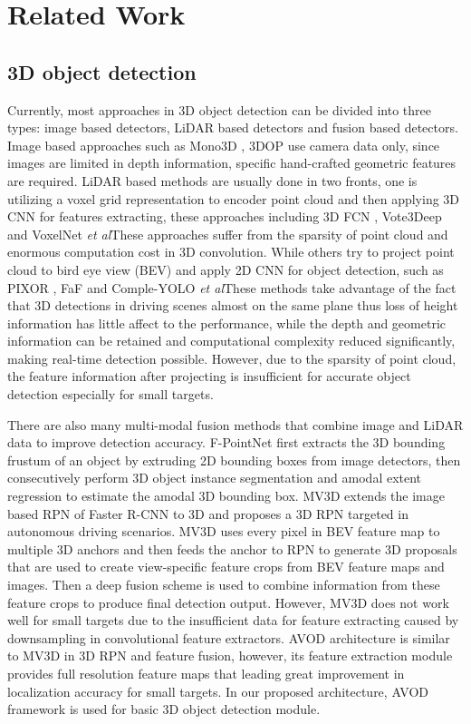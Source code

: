 \documentclass{bmvc2k}
\def\etal{\emph{et al}\bmvaOneDot}
\begin{document}
\section{Related Work}
\label{sec:related work}

\subsection{3D object detection}
Currently, most approaches in 3D object detection can be divided into three types: image based detectors, LiDAR based detectors and fusion based detectors. Image based approaches such as Mono3D \cite{7780605}, 3DOP \cite{chen20183d} use camera data only, since images are limited in depth information, specific hand-crafted geometric features are required. LiDAR based methods are usually done in two fronts, one is utilizing a voxel grid representation to encoder point cloud and then applying 3D CNN for features extracting, these approaches including 3D FCN \cite{li20173d}, Vote3Deep \cite{engelcke2017vote3deep} and VoxelNet \cite{zhou2018voxelnet} \etal These approaches suffer from the sparsity of point cloud and enormous computation cost in 3D convolution. While others try to project point cloud to bird eye view (BEV) and apply 2D CNN for object detection, such as PIXOR \cite{yang2018pixor}, FaF \cite{luo2018fast} and Comple-YOLO \cite{simon2018complex} \etal These methods take advantage of the fact that 3D detections in driving scenes almost on the same plane thus loss of height information has little affect to the performance, while the depth and geometric information can be retained and computational complexity reduced significantly, making real-time detection possible. However, due to the sparsity of point cloud, the feature information after projecting is insufficient for accurate object detection especially for small targets.

There are also many multi-modal fusion methods that combine image and LiDAR data to improve detection accuracy. F-PointNet \cite{qi2018frustum} first extracts the 3D bounding frustum of an object by extruding 2D bounding boxes from image detectors, then consecutively perform 3D object instance segmentation and amodal extent regression to estimate the amodal 3D bounding box. MV3D \cite{chen2017multi} extends the image based RPN of Faster R-CNN\cite{ren2015faster} to 3D and proposes a 3D RPN targeted in autonomous driving scenarios. MV3D uses every pixel in BEV feature map to multiple 3D anchors and then feeds the anchor to RPN to generate 3D proposals that are used to create view-specific feature crops from BEV feature maps and images. Then a deep fusion scheme is used to combine information from these feature crops to produce final detection output. However, MV3D does not work well for small targets due to the insufficient data for feature extracting caused by downsampling in convolutional feature extractors. AVOD \cite{ku2018joint} architecture is similar to MV3D in 3D RPN and feature fusion, however, its feature extraction module provides full resolution feature maps that leading great improvement in localization accuracy for small targets. In our proposed architecture, AVOD framework is used for basic 3D object detection module.
\end{document}
